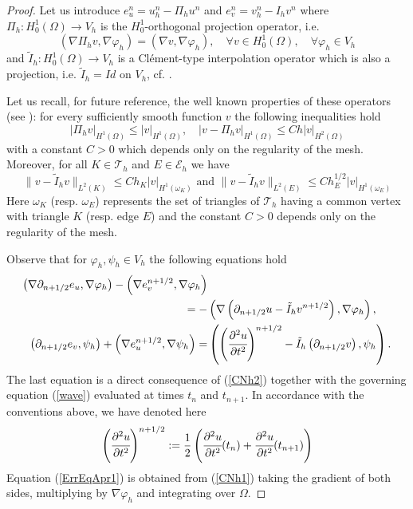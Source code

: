 \documentclass{imanum}
\newcommand{\Th}{\mathcal{T}_h}
\begin{document}
\begin{proof} Let us introduce $e^n_u = u^n_h - \Pi_h u^n$ and $e^n_v = v^n_h - I_h v^n$ where
$\Pi_h : H^1_0 (\Omega) \to V_h$ is the $H^1_0$-orthogonal projection
operator, i.e.
\begin{equation}\label{Pih}
 \left(\nabla \Pi_h v, \nabla\varphi_h\right) = \left(\nabla v,
   \nabla\varphi_h\right), \hspace{1em} \forall v \in H^1_0 (\Omega),\hspace{1em}\forall \varphi_h \in V_h 
\end{equation}
and $\tilde I_h : H^1_0 (\Omega) \to V_h$ is a Cl{\'e}ment-type interpolation operator which is also a projection, i.e. $\tilde I_h=Id$ on $V_h$, cf. \cite{ErnGue, ScoZh}. 

Let us recall, for future reference, the well known properties of these operators (see  \cite{ErnGue}): for every sufficiently smooth function $v$ the following inequalities hold
\begin{equation}\label{Pinterp}
  | \Pi_h v |_{H^1(\Omega)}\leq | v |_{H^1(\Omega)}, 
  \hspace{1em} | v - \Pi_h v |_{H^1(\Omega)} \leq Ch | v |_{H^2(\Omega)}
\end{equation}
with a constant $C > 0$ which depends only on the regularity of the mesh.
Moreover, for all $K\in\Th$ and  $E \in \mathcal{E}_h$ we have 
\begin{equation}\label{Clement}
 \| v - \tilde I_h v \|_{L^2(K)} \leq Ch_K |v |_{H^1(\omega_K)}
\text{ and }
\| v - \tilde I_h v \|_{L^2(E)} \leq Ch_{E}^{1 / 2} | v |_{H^1(\omega_{E})}
\end{equation}
Here $\omega_K$  (resp. $\omega_E$) represents the set of triangles of $\mathcal{T}_h$ having a common vertex with triangle $K$ (resp. edge $E$) and the constant $C > 0$ depends only on the regularity of the mesh.

Observe that for $\varphi_h,\psi_h\in V_h$ the following equations hold 
  \begin{align}
   \notag\left(\nabla\partial_{n + 1 / 2} e_u,\nabla\varphi_h\right)  - \left(\nabla e_v^{n + 1 / 2},\nabla\varphi_h\right) &\\
   = -&\left(\nabla  \left( \partial_{n + 1 / 2}
     u - \tilde I_h v^{n + 1 / 2}\right),\nabla\varphi_h\right), 
     \label{ErrEqApr1}\\
    \left( \partial_{n + 1 / 2} e_v, \psi_h\right)  + \left( \nabla e_u^{n + 1 / 2}, \nabla
     \psi_h\right)  = & \left( \left( \cfrac{\partial^2 u}{\partial t^2}\right)^{n + 1 / 2} - \tilde I_h \left( \partial_{n + 1 / 2}
     v\right), \psi_h\right).
     \label{ErrEqApr2}
  \end{align}
The last equation is a direct consequence of  (\ref{CNh2}) together with the governing equation (\ref{wave}) evaluated at times $t_n$ and $t_{n+1}$. In accordance with the conventions above, we have denoted here
$$
\left(\cfrac{\partial^2 u}{\partial t^2}\right)^{n + 1 / 2}:=\frac{1}{2}\left(\cfrac{\partial^2 u}{\partial t^2}(t_n)+\cfrac{\partial^2 u}{\partial t^2}(t_{n+1})\right)
$$
Equation (\ref{ErrEqApr1}) is obtained from (\ref{CNh1}) taking the gradient of both sides, multiplying by $\nabla\varphi_h$ and integrating over $\Omega$. 


\end{proof}
\end{document}

